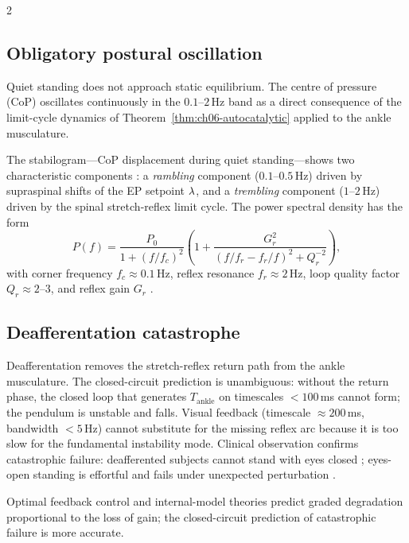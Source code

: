 \begin{multicols}{2}
\subsection{Obligatory postural oscillation}

\begin{proposition}
\label{prop:ch06-posturalsway}
Quiet standing does not approach static equilibrium.  The centre of pressure
(CoP) oscillates continuously in the $0.1$--$2$\,Hz band as a direct
consequence of the limit-cycle dynamics of
Theorem~\ref{thm:ch06-autocatalytic} applied to the ankle musculature.
\end{proposition}

The stabilogram---CoP displacement during quiet standing---shows two
characteristic components \citep{zatsiorsky2000}: a \emph{rambling}
component ($0.1$--$0.5$\,Hz) driven by supraspinal shifts of the EP
setpoint $\lambda$, and a \emph{trembling} component ($1$--$2$\,Hz)
driven by the spinal stretch-reflex limit cycle.  The power spectral
density has the form
\begin{equation}
  P(f) = \frac{P_0}{1 + (f/f_c)^2}
         \left(1 + \frac{G_r^2}{(f/f_r - f_r/f)^2 + Q_r^{-2}}\right),
  \label{eq:ch06-psd}
\end{equation}
with corner frequency $f_c \approx 0.1$\,Hz, reflex resonance
$f_r \approx 2$\,Hz, loop quality factor $Q_r \approx 2$--$3$, and
reflex gain $G_r$ \citep{winter1995,morasso2002,loram2002}.

\subsection{Deafferentation catastrophe}

Deafferentation removes the stretch-reflex return path from the ankle
musculature.  The closed-circuit prediction is unambiguous: without the
return phase, the closed loop that generates $T_{\mathrm{ankle}}$ on
timescales $< 100$\,ms cannot form; the pendulum is unstable and falls.
Visual feedback (timescale $\approx 200$\,ms, bandwidth $< 5$\,Hz) cannot
substitute for the missing reflex arc because it is too slow for the
fundamental instability mode.  Clinical observation confirms
catastrophic failure: deafferented subjects cannot stand with eyes closed
\citep{cole1991,sainburg1995}; eyes-open standing is effortful and fails
under unexpected perturbation \citep{lajoie1996}.

Optimal feedback control \citep{todorov2002} and internal-model theories
\citep{kawato1999,wolpert2000} predict graded degradation proportional to
the loss of gain; the closed-circuit prediction of catastrophic failure is
more accurate.

\end{multicols}

